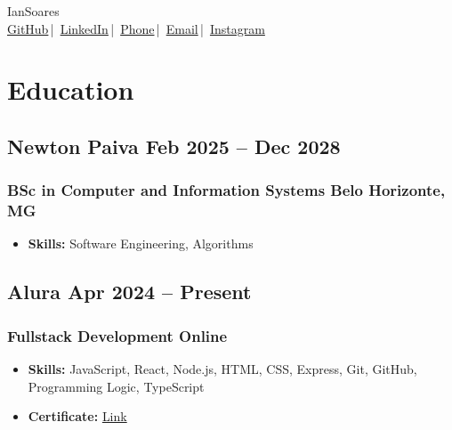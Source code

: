 \documentclass[11pt]{article}
\begin{document}
\begin{center}
    {\fontsize{36}{36}\selectfont\interthin Ian\interheavy Soares} \\[1em]{\color{icnclr}} \href{https://github.com/ianptkcs}{GitHub}\,|\,{\color{icnclr}} \href{https://www.linkedin.com/in/ianptkcs/}{LinkedIn}\,|\,{\color{icnclr}} \href{https://wa.me/5531998490641}{Phone}\,|\,{\color{icnclr}} \href{mailto:ianptkcs@gmail.com}{Email}\,|\,{\color{icnclr}} \href{https://www.instagram.com/ianptkcs/}{Instagram}
\end{center}

\section{Education}

\subsection{ Newton Paiva \hfill  Feb 2025  -- Dec 2028   }
\subsubsection{ BSc in Computer and Information Systems \hfill Belo Horizonte, MG }
\vspace{10pt} %
\begin{itemize}
    
    \item \textbf{Skills:}  Software Engineering, Algorithms
    
    
\end{itemize}

\subsection{ Alura \hfill  Apr 2024  -- Present   }
\subsubsection{ Fullstack Development \hfill Online }
\vspace{10pt} %
\begin{itemize}
    
    \item \textbf{Skills:}  JavaScript, React, Node.js, HTML, CSS, Express, Git, GitHub, Programming Logic, TypeScript
    
    
    \item \textbf{Certificate:} \href{ https://cursos.alura.com.br/user/ianptkcs/fullCertificate/1045d336cd07a99c9b48634105c74835 }{ Link }
    
\end{itemize}
\end{document}
